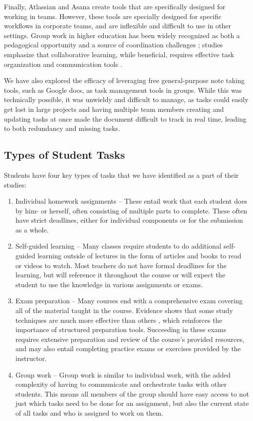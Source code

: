 \documentclass[11pt,oneside]{article}
\begin{document}
Finally, Atlassian and Asana create tools that are specifically designed for working in teams. However, these tools are specially designed for specific workflows in corporate teams, and are inflexible and difficult to use in other settings. Group work in higher education has been widely recognized as both a pedagogical opportunity and a source of coordination challenges \citep{johnson2009educational}; studies emphasize that collaborative learning, while beneficial, requires effective task organization and communication tools \citep{dunlosky2013improving}.

We have also explored the efficacy of leveraging free general-purpose note taking tools, such as Google docs, as task management tools in groups. While this was technically possible, it was unwieldy and difficult to manage, as tasks could easily get lost in large projects and having multiple team members creating and updating tasks at once made the document difficult to track in real time, leading to both redundancy and missing tasks.
\subsection{Types of Student Tasks}
Students have four key types of tasks that we have identified as a part of their studies: 

\begin{enumerate}
\item Individual homework assignments – These entail work that each student does by him- or herself, often consisting of multiple parts to complete. These often have strict deadlines, either for individual components or for the submission as a whole.
\item Self-guided learning – Many classes require students to do additional self-guided learning outside of lectures in the form of articles and books to read or videos to watch. Most teachers do not have formal deadlines for the learning, but will reference it throughout the course or will expect the student to use the knowledge in various assignments or exams.
\item Exam preparation – Many courses end with a comprehensive exam covering all of the material taught in the course. Evidence shows that some study techniques are much more effective than others \citep{dunlosky2013improving}, which reinforces the importance of structured preparation tools. Succeeding in these exams requires extensive preparation and review of the course’s provided resources, and may also entail completing practice exams or exercises provided by the instructor.
\item Group work – Group work is similar to individual work, with the added complexity of having to communicate and orchestrate tasks with other students. This means all members of the group should have easy access to not just which tasks need to be done for an assignment, but also the current state of all tasks and who is assigned to work on them.
\end{enumerate}
\end{document}
